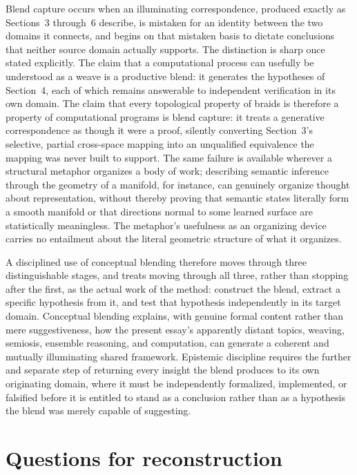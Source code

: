 \documentclass[11pt,openany]{book}
\begin{document}
Blend capture occurs when an illuminating correspondence, produced exactly as Sections~3 through~6 describe, is mistaken for an identity between the two domains it connects, and begins on that mistaken basis to dictate conclusions that neither source domain actually supports. The distinction is sharp once stated explicitly. The claim that a computational process can usefully be understood as a weave is a productive blend: it generates the hypotheses of Section~4, each of which remains answerable to independent verification in its own domain. The claim that every topological property of braids is therefore a property of computational programs is blend capture: it treats a generative correspondence as though it were a proof, silently converting Section~3's selective, partial cross-space mapping into an unqualified equivalence the mapping was never built to support. The same failure is available wherever a structural metaphor organizes a body of work; describing semantic inference through the geometry of a manifold, for instance, can genuinely organize thought about representation, without thereby proving that semantic states literally form a smooth manifold or that directions normal to some learned surface are statistically meaningless. The metaphor's usefulness as an organizing device carries no entailment about the literal geometric structure of what it organizes.

A disciplined use of conceptual blending therefore moves through three distinguishable stages, and treats moving through all three, rather than stopping after the first, as the actual work of the method: construct the blend, extract a specific hypothesis from it, and test that hypothesis independently in its target domain. Conceptual blending explains, with genuine formal content rather than mere suggestiveness, how the present essay's apparently distant topics, weaving, semiosis, ensemble reasoning, and computation, can generate a coherent and mutually illuminating shared framework. Epistemic discipline requires the further and separate step of returning every insight the blend produces to its own originating domain, where it must be independently formalized, implemented, or falsified before it is entitled to stand as a conclusion rather than as a hypothesis the blend was merely capable of suggesting.

\section*{Questions for reconstruction}
\end{document}
